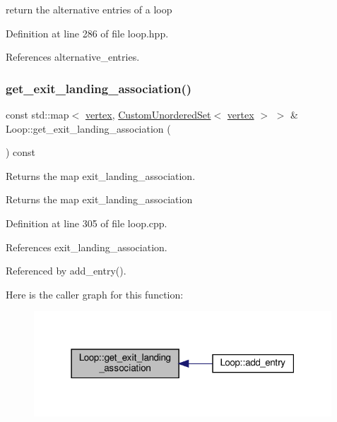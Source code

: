 return the alternative entries of a loop 



Definition at line 286 of file loop.\+hpp.



References alternative\+\_\+entries.

\mbox{\label{classLoop_a54479dad14b619a07e80043aec79bcac}} 
\subsubsection{\texorpdfstring{get\+\_\+exit\+\_\+landing\+\_\+association()}{get\_exit\_landing\_association()}}
{\footnotesize\ttfamily const std\+::map$<$ \hyperlink{graph_8hpp_abefdcf0544e601805af44eca032cca14}{vertex}, \hyperlink{classCustomUnorderedSet}{Custom\+Unordered\+Set}$<$ \hyperlink{graph_8hpp_abefdcf0544e601805af44eca032cca14}{vertex} $>$ $>$ \& Loop\+::get\+\_\+exit\+\_\+landing\+\_\+association (\begin{DoxyParamCaption}{ }\end{DoxyParamCaption}) const}



Returns the map exit\+\_\+landing\+\_\+association. 

\begin{DoxyReturn}{Returns}
the map exit\+\_\+landing\+\_\+association 
\end{DoxyReturn}


Definition at line 305 of file loop.\+cpp.



References exit\+\_\+landing\+\_\+association.



Referenced by add\+\_\+entry().

Here is the caller graph for this function\+:
\nopagebreak
\begin{figure}[H]
\begin{center}
\leavevmode
\includegraphics[width=316pt]{de/d77/classLoop_a54479dad14b619a07e80043aec79bcac_icgraph}
\end{center}
\end{figure}
\mbox{\label{classLoop_a8c396bce6167020b05c88ce09d59999b}} 
